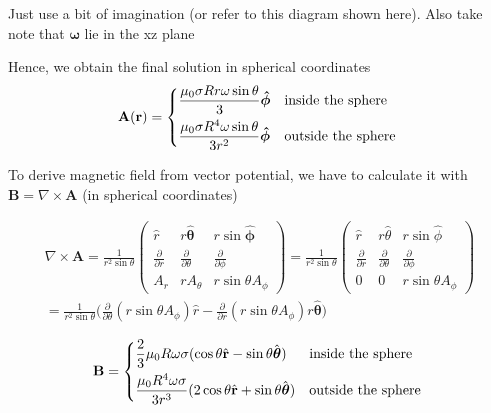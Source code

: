 Just use a bit of imagination (or refer to this diagram shown here). Also take note that $\boldsymbol{\omega}$ lie in the xz plane

Hence, we obtain the final solution in spherical coordinates
$$\mathbf{A(r)} =
    \begin{dcases*}
        \frac{\mu_0\sigma Rr \omega \sin \theta}{3}\boldsymbol{\hat{\phi}}      & \text{inside the sphere}  \\
        \frac{\mu_0\sigma R^4 \omega \sin \theta}{3 r^2}\boldsymbol{\hat{\phi}} & \text{outside the sphere}
    \end{dcases*}$$

To derive magnetic field from vector potential, we have to calculate it with $\mathbf{B}=\nabla \times \mathbf{A}$ (in spherical coordinates)

\begin{multline}
    \nabla \times \mathbf{A}=\frac{1}{r^2 \sin\theta}
    \begin{pmatrix}
        \hat{r}                     & r\hat{\boldsymbol{\theta}}      & r\sin\hat{\boldsymbol{\phi}}  \\
        \frac{\partial}{\partial r} & \frac{\partial}{\partial\theta} & \frac{\partial}{\partial\phi} \\
        A_r                         & rA_\theta                       & r\sin\theta A_\phi
    \end{pmatrix}
    =\frac{1}{r^2 \sin\theta}\begin{pmatrix}
        \hat{r}                     & r\hat{\theta}                   & r\sin\hat{\phi}               \\
        \frac{\partial}{\partial r} & \frac{\partial}{\partial\theta} & \frac{\partial}{\partial\phi} \\
        0                           & 0                               & r\sin\theta A_\phi
    \end{pmatrix}
    \\=\frac{1}{r^2 \sin\theta}\bigg(\frac{\partial}{\partial \theta} (r\sin\theta A_\phi)\hat{r}-\frac{\partial}{\partial r} (r\sin\theta A_\phi)r\hat{\boldsymbol{\theta}}\bigg)
\end{multline}

\begin{equation}
    \mathbf{B} =
    \begin{dcases*}
        \frac{2}{3}\mu_0 R \omega \sigma (\cos\theta \hat{r}-\sin \theta \hat{\boldsymbol{\theta}})      & \text{inside the sphere}  \\
        \frac{\mu_0 R^4 \omega \sigma}{3r^3} (2\cos\theta \hat{r}+\sin \theta \hat{\boldsymbol{\theta}}) & \text{outside the sphere}
    \end{dcases*}
\end{equation}

